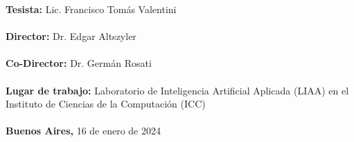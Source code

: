 \begin{titlepage}
    \begin{minipage}[t]{0.9\textwidth}
        {\normalsize{\textbf{Tesista: }}{\normalsize{Lic. Francisco Tomás Valentini}}}\\ \\
        {\normalsize{\textbf{Director: }}{\normalsize{Dr. Edgar Altszyler}}}\\ \\
        {\normalsize{\textbf{Co-Director: }}{\normalsize{Dr. Germán Rosati}}}\\ \\
        {\normalsize{\textbf{Lugar de trabajo: }}{\normalsize{Laboratorio de Inteligencia Artificial Aplicada (LIAA) en el Instituto de Ciencias de la Computación (ICC)}}}\\ \\
        {\normalsize{\textbf{Buenos Aires, }}{\normalsize{16 de enero de 2024}}}
    \end{minipage}


\end{titlepage}
